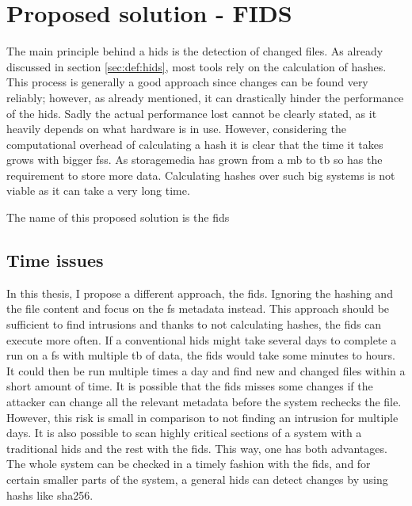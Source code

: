 
\section{Proposed solution - FIDS}
\label{sec:fids}

The main principle behind a \gls{hids} is the detection of changed files. As already discussed in section \ref{sec:def:hids}, most tools rely on the calculation of hashes. This process is generally a good approach since changes can be found very reliably; however, as already mentioned, it can drastically hinder the performance of the \gls{hids}. Sadly the actual performance lost cannot be clearly stated, as it heavily depends on what hardware is in use. However, considering the computational overhead of calculating a \gls{hash} it is clear that the time it takes grows with bigger \glspl{fs}. As \gls{storagemedia} has grown from a \gls{mb} to \gls{tb} so has the requirement to store more data. Calculating hashes over such big systems is not viable as it can take a very long time. \cite{hash:slow, hash:veryslow, hash:speed}

The name of this proposed solution is the \gls{fids}

\subsection{Time issues}

In this thesis, I propose a different approach, the \gls{fids}. Ignoring the hashing and the file content and focus on the \gls{fs} \gls{metadata} instead. This approach should be sufficient to find \glspl{intrusion} and thanks to not calculating hashes, the \gls{fids} can execute more often. If a conventional \gls{hids} might take several days to complete a run on a \gls{fs} with multiple \gls{tb} of data, the \gls{fids} would take some minutes to hours. It could then be run multiple times a day and find new and changed files within a short amount of time. It is possible that the \gls{fids} misses some changes if the attacker can change all the relevant \gls{metadata} before the system rechecks the file. However, this risk is small in comparison to not finding an \gls{intrusion} for multiple days. It is also possible to scan highly critical sections of a system with a traditional \gls{hids} and the rest with the \gls{fids}. This way, one has both advantages. The whole system can be checked in a timely fashion with the \gls{fids}, and for certain smaller parts of the system, a general \gls{hids} can detect changes by using \glspl{hash} like \gls{sha256}.

